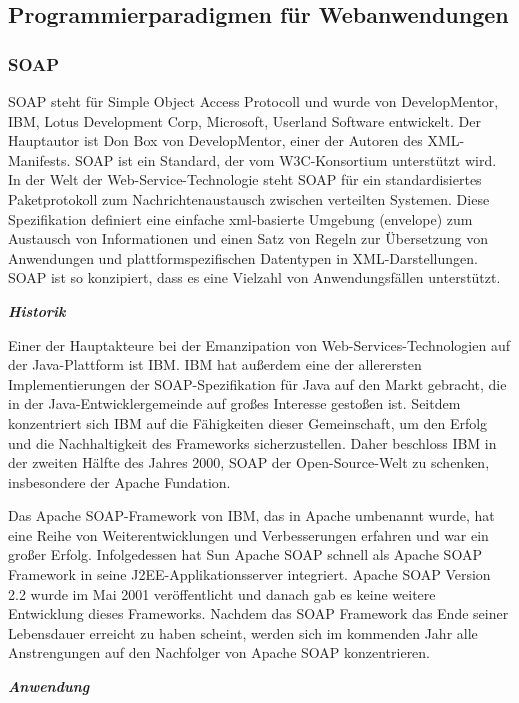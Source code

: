 \subsection{Programmierparadigmen für Webanwendungen}
\subsubsection{SOAP}
SOAP steht für Simple Object Access Protocoll und wurde von DevelopMentor, IBM, Lotus Development Corp, Microsoft, Userland Software entwickelt. Der Hauptautor ist Don Box von DevelopMentor, einer der Autoren des XML-Manifests. SOAP ist ein Standard, der vom W3C-Konsortium unterstützt wird. In der Welt der Web-Service-Technologie steht SOAP für ein standardisiertes Paketprotokoll zum Nachrichtenaustausch zwischen verteilten Systemen. Diese Spezifikation definiert eine einfache xml-basierte Umgebung (envelope) zum Austausch von Informationen und einen Satz von Regeln zur Übersetzung von Anwendungen und plattformspezifischen Datentypen in XML-Darstellungen. SOAP ist so konzipiert, dass es eine Vielzahl von Anwendungsfällen unterstützt.\cite{saop1}

\textit{\textbf{Historik}}

Einer der Hauptakteure bei der Emanzipation von Web-Services-Technologien auf der Java-Plattform ist IBM. IBM hat außerdem eine der allerersten Implementierungen der SOAP-Spezifikation für Java auf den Markt gebracht, die in der Java-Entwicklergemeinde auf großes Interesse gestoßen ist. Seitdem konzentriert sich IBM auf die Fähigkeiten dieser Gemeinschaft, um den Erfolg und die Nachhaltigkeit des Frameworks sicherzustellen. Daher beschloss IBM in der zweiten Hälfte des Jahres 2000, SOAP der Open-Source-Welt zu schenken, insbesondere der Apache Fundation.

Das Apache SOAP-Framework von IBM, das in Apache umbenannt wurde, hat eine Reihe von Weiterentwicklungen und Verbesserungen erfahren und war ein großer Erfolg. Infolgedessen hat Sun Apache SOAP schnell als Apache SOAP Framework in seine J2EE-Applikationsserver integriert. Apache SOAP Version 2.2 wurde im Mai 2001 veröffentlicht und danach gab es keine weitere Entwicklung dieses Frameworks. Nachdem das SOAP Framework das Ende seiner Lebensdauer erreicht zu haben scheint, werden sich im kommenden Jahr alle Anstrengungen auf den Nachfolger von Apache SOAP konzentrieren.

\textit{\textbf{Anwendung}}

